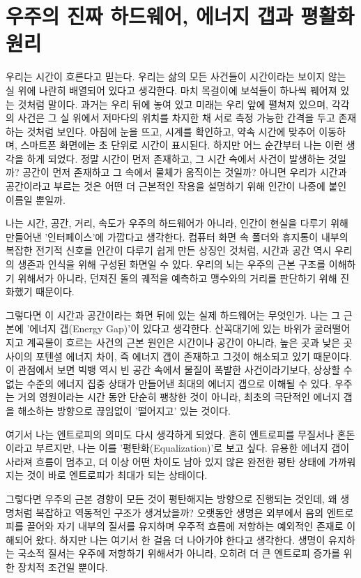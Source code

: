

\section{우주의 진짜 하드웨어, 에너지 갭과 평활화 원리}
우리는 시간이 흐른다고 믿는다. 우리는 삶의 모든 사건들이 시간이라는 보이지 않는 실 위에 나란히 배열되어 있다고 생각한다. 마치 목걸이에 보석들이 하나씩 꿰어져 있는 것처럼 말이다. 과거는 우리 뒤에 놓여 있고 미래는 우리 앞에 펼쳐져 있으며, 각각의 사건은 그 실 위에서 저마다의 위치를 차지한 채 서로 측정 가능한 간격을 두고 존재하는 것처럼 보인다. 아침에 눈을 뜨고, 시계를 확인하고, 약속 시간에 맞추어 이동하며, 스마트폰 화면에는 초 단위로 시간이 표시된다. 하지만 어느 순간부터 나는 이런 생각을 하게 되었다. 정말 시간이 먼저 존재하고, 그 시간 속에서 사건이 발생하는 것일까? 공간이 먼저 존재하고 그 속에서 물체가 움직이는 것일까? 아니면 우리가 시간과 공간이라고 부르는 것은 어떤 더 근본적인 작용을 설명하기 위해 인간이 나중에 붙인 이름일 뿐일까.

나는 시간, 공간, 거리, 속도가 우주의 하드웨어가 아니라, 인간이 현실을 다루기 위해 만들어낸 '인터페이스'에 가깝다고 생각한다. 컴퓨터 화면 속 폴더와 휴지통이 내부의 복잡한 전기적 신호를 인간이 다루기 쉽게 만든 상징인 것처럼, 시간과 공간 역시 우리의 생존과 인식을 위해 구성된 화면일 수 있다. 우리의 뇌는 우주의 근본 구조를 이해하기 위해서가 아니라, 던져진 돌의 궤적을 예측하고 맹수와의 거리를 판단하기 위해 진화했기 때문이다.

그렇다면 이 시간과 공간이라는 화면 뒤에 있는 실제 하드웨어는 무엇인가. 나는 그 근본에 '에너지 갭(Energy Gap)'이 있다고 생각한다. 산꼭대기에 있는 바위가 굴러떨어지고 계곡물이 흐르는 사건의 근본 원인은 시간이나 공간이 아니라, 높은 곳과 낮은 곳 사이의 포텐셜 에너지 차이, 즉 에너지 갭이 존재하고 그것이 해소되고 있기 때문이다. 이 관점에서 보면 빅뱅 역시 빈 공간 속에서 물질이 폭발한 사건이라기보다, 상상할 수 없는 수준의 에너지 집중 상태가 만들어낸 최대의 에너지 갭으로 이해될 수 있다. 우주는 거의 영원이라는 시간 동안 단순히 팽창한 것이 아니라, 최초의 극단적인 에너지 갭을 해소하는 방향으로 끊임없이 '떨어지고' 있는 것이다.

여기서 나는 엔트로피의 의미도 다시 생각하게 되었다. 흔히 엔트로피를 무질서나 혼돈이라고 부르지만, 나는 이를 '평탄화(Equalization)'로 보고 싶다. 유용한 에너지 갭이 사라져 흐름이 멈추고, 더 이상 어떤 차이도 남아 있지 않은 완전한 평탄 상태에 가까워지는 것이 바로 엔트로피가 최대가 되는 상태이다.

그렇다면 우주의 근본 경향이 모든 것이 평탄해지는 방향으로 진행되는 것인데, 왜 생명처럼 복잡하고 역동적인 구조가 생겨났을까? 오랫동안 생명은 외부에서 음의 엔트로피를 끌어와 자기 내부의 질서를 유지하며 우주적 흐름에 저항하는 예외적인 존재로 이해되어 왔다. 하지만 나는 여기서 한 걸음 더 나아가야 한다고 생각한다. 생명이 유지하는 국소적 질서는 우주에 저항하기 위해서가 아니라, 오히려 더 큰 엔트로피 증가를 위한 장치적 조건일 뿐이다.

